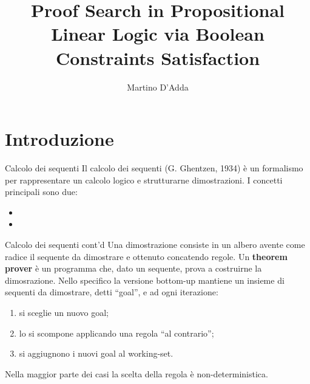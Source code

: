 \documentclass{beamer}
\title{Proof Search in Propositional Linear Logic via Boolean Constraints Satisfaction}
\author{Martino D'Adda}
\begin{document}
\maketitle


\section{Introduzione}
\begin{frame}{Calcolo dei sequenti}
	Il calcolo dei sequenti (G. Ghentzen, 1934) è un formalismo per rappresentare un calcolo logico e strutturarne dimostrazioni.
	I concetti principali sono due:
	\begin{itemize}
		\item {}
		\item {}
	\end{itemize}
\end{frame}

\begin{frame}{Calcolo dei sequenti cont'd}
	Una dimostrazione consiste in un albero avente come radice il sequente da dimostrare e ottenuto concatendo regole.
	Un \textbf{theorem prover} è un programma che, dato un sequente, prova a costruirne la dimosrazione.
	Nello specifico la versione bottom-up mantiene un insieme di sequenti da dimostrare, detti ``goal'', e ad ogni iterazione:
	\begin{enumerate}
		\item si sceglie un nuovo goal;
		\item lo si scompone applicando una regola ``al contrario'';
		\item si aggiugnono i nuovi goal al working-set.
	\end{enumerate}
	Nella maggior parte dei casi la scelta della regola è non-deterministica.
\end{frame}
\end{document}
